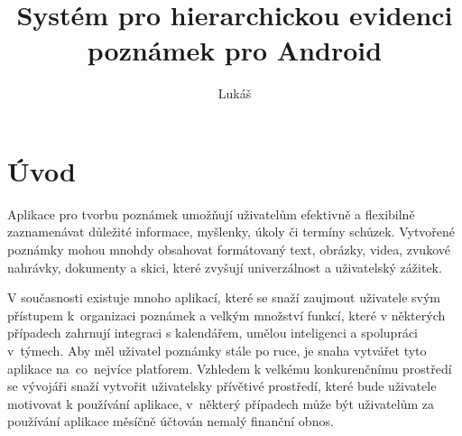 \documentclass[czech, bc, kiv, he, iso690numb]{fasthesis}
\title{Systém pro hierarchickou evidenci poznámek pro Android}
\author{Lukáš}{Runt}{}{}
\begin{document}
\frontpages[tm] %
\tableofcontents
% 
%
\makeatletter%
\ifx\FASThesis@style\c@fullcolor%
\else%
\fi%
\makeatother%
%
% 
%
%
\chapter{Úvod} \label{uvod}

Aplikace pro tvorbu poznámek umožňují uživatelům efektivně a flexibilně zaznamenávat důležité informace, myšlenky, úkoly či termíny schůzek. Vytvořené poznámky mohou mnohdy obsahovat formátovaný text, obrázky, videa, zvukové nahrávky, dokumenty a skici, které zvyšují univerzálnost a uživatelský zážitek.

V současnosti existuje mnoho aplikací, které se snaží zaujmout uživatele svým přístupem k~organizaci poznámek a velkým množství funkcí, které v některých případech zahrnují integraci s kalendářem, umělou inteligenci a spolupráci v~týmech. Aby měl uživatel poznámky stále po ruce, je snaha vytvářet tyto aplikace na~co~nejvíce platforem. Vzhledem k velkému konkurenčnímu prostředí se vývojáři snaží vytvořit uživatelsky přívětivé prostředí, které bude uživatele motivovat k používání aplikace, v~některý případech může být uživatelům za používání aplikace měsíčně účtován nemalý finanční obnos.
\end{document}
